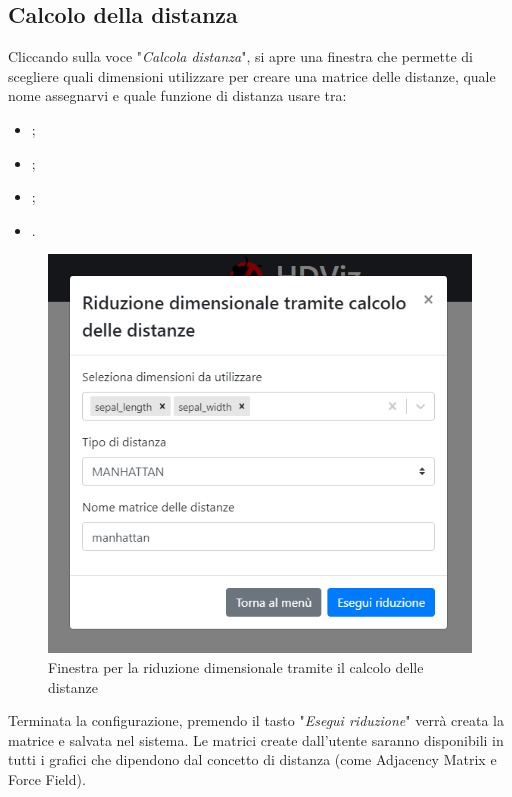 \newpage
\subsection{Calcolo della distanza}
Cliccando sulla voce "\textit{Calcola distanza}", si apre una finestra che permette di scegliere quali dimensioni utilizzare per creare una matrice delle distanze, quale nome assegnarvi e quale funzione di distanza usare tra:

\begin{itemize}
	\item {};
	\item {};
	\item {};
	\item {}.
\end{itemize}

\begin{figure}[H]
		\includegraphics[scale=0.65]{Images/CalcoloDistanze.png}
		\centering
		\caption{Finestra per la riduzione dimensionale tramite il calcolo delle distanze}
\end{figure}

Terminata la configurazione, premendo il tasto "\textit{Esegui riduzione}" verrà creata la matrice e salvata nel sistema. Le matrici create dall'utente saranno disponibili in tutti i grafici che dipendono dal concetto di distanza (come Adjacency Matrix e Force Field).

